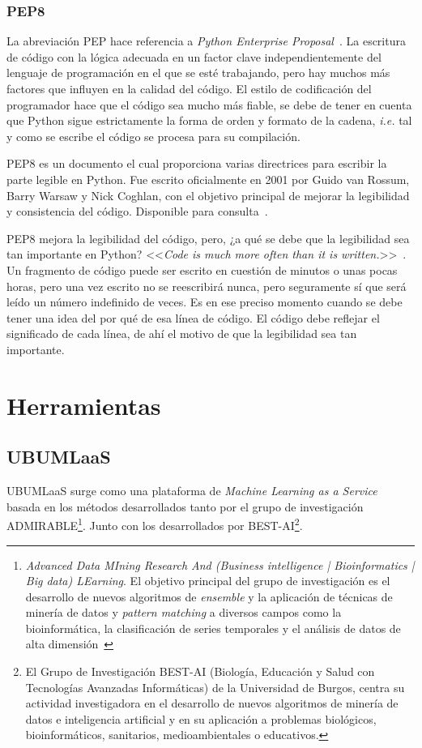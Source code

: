 \subsubsection{PEP8}
La abreviación PEP hace referencia a \textit{Python Enterprise Proposal}~\cite{pep8javatpoint}. La escritura de código con la lógica adecuada en un factor clave independientemente del lenguaje de programación en el que se esté trabajando, pero hay muchos más factores que influyen en la calidad del código. El estilo de codificación del programador hace que el código sea mucho más fiable, se debe de tener en cuenta que Python sigue estrictamente la forma de orden y formato de la cadena, \textit{i.e.} tal y como se escribe el código se procesa para su compilación.

PEP8 es un documento el cual proporciona varias directrices para escribir la parte legible en Python. Fue escrito oficialmente en 2001 por Guido van Rossum, Barry Warsaw y Nick Coghlan, con el objetivo principal de mejorar la legibilidad y consistencia del código. Disponible para consulta~\cite{rossum_warsaw_coghlan}.

PEP8 mejora la legibilidad del código, pero, ¿a qué se debe que la legibilidad sea tan importante en Python? <<\textit{Code is much more often than it is written.}>>~\cite{guidophrase}. Un fragmento de código puede ser escrito en cuestión de minutos o unas pocas horas, pero una vez escrito no se reescribirá nunca, pero seguramente sí que será leído un número indefinido de veces. Es en ese preciso momento cuando se debe tener una idea del por qué de esa línea de código. El código debe reflejar el significado de cada línea, de ahí el motivo de que la legibilidad sea tan importante.


\section{Herramientas}\label{sec:herramientas}
\subsection{UBUMLaaS}\label{UBUMLaaS}
UBUMLaaS surge como una plataforma de \textit{Machine Learning as a Service} basada en los métodos desarrollados tanto por el grupo de investigación ADMIRABLE\footnote{\textit{Advanced Data MIning Research And (Business intelligence | Bioinformatics | Big data) LEarning}.  El objetivo principal del grupo de investigación es el desarrollo de nuevos algoritmos de \textit{ensemble} y la aplicación de técnicas de minería de datos y \textit{pattern matching} a diversos campos como la bioinformática, la clasificación de series temporales y el análisis de datos de alta dimensión~\cite{admirable_intro}}. Junto con los desarrollados por BEST-AI\footnote{El Grupo de Investigación BEST-AI (Biología, Educación y Salud con Tecnologías Avanzadas Informáticas) de la Universidad de Burgos, centra su actividad investigadora en el desarrollo de nuevos algoritmos de minería de datos e inteligencia artificial y en su aplicación a problemas biológicos, bioinformáticos, sanitarios, medioambientales o educativos.}.

